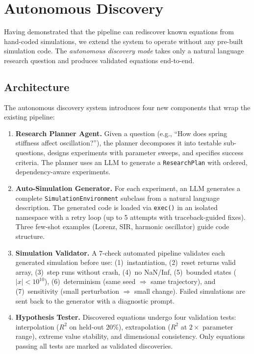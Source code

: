 \documentclass{article}
\begin{document}
\section{Autonomous Discovery}
\label{sec:autonomous}

Having demonstrated that the pipeline can rediscover known equations
from hand-coded simulations, we extend the system to operate without
any pre-built simulation code. The \emph{autonomous discovery mode}
takes only a natural language research question and produces validated
equations end-to-end.

\subsection{Architecture}

The autonomous discovery system introduces four new components that
wrap the existing pipeline:

\begin{enumerate}
\item \textbf{Research Planner Agent.} Given a question (e.g., ``How does
  spring stiffness affect oscillation?''), the planner decomposes it into
  testable sub-questions, designs experiments with parameter sweeps, and
  specifies success criteria. The planner uses an LLM to generate a
  \texttt{ResearchPlan} with ordered, dependency-aware experiments.

\item \textbf{Auto-Simulation Generator.} For each experiment, an LLM
  generates a complete \texttt{SimulationEnvironment} subclass from a
  natural language description. The generated code is loaded via
  \texttt{exec()} in an isolated namespace with a retry loop (up to 5
  attempts with traceback-guided fixes). Three few-shot examples
  (Lorenz, SIR, harmonic oscillator) guide code structure.

\item \textbf{Simulation Validator.} A 7-check automated pipeline
  validates each generated simulation before use:
  (1)~instantiation, (2)~reset returns valid array, (3)~step runs
  without crash, (4)~no NaN/Inf, (5)~bounded states ($|x| < 10^{10}$),
  (6)~determinism (same seed $\Rightarrow$ same trajectory), and
  (7)~sensitivity (small perturbation $\Rightarrow$ small change).
  Failed simulations are sent back to the generator with a diagnostic
  prompt.

\item \textbf{Hypothesis Tester.} Discovered equations undergo four
  validation tests: interpolation ($R^2$ on held-out 20\%), extrapolation
  ($R^2$ at $2\times$ parameter range), extreme value stability, and
  dimensional consistency. Only equations passing all tests are marked
  as validated discoveries.
\end{enumerate}
\end{document}
